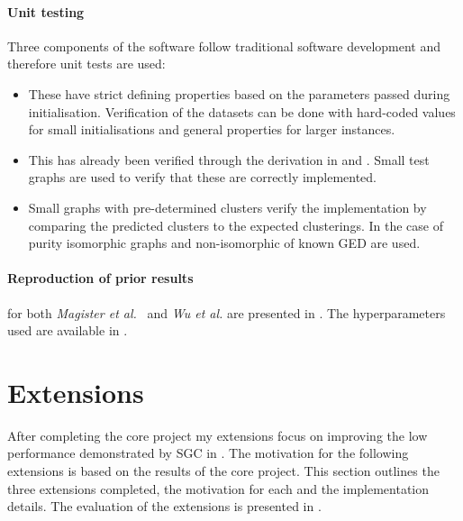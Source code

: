 \paragraph{Unit testing}
Three components of the software follow traditional software development and therefore unit tests are used:
\begin{itemize}
    \item[] 
        These have strict defining properties based on the parameters passed during initialisation.
        Verification of the datasets can be done with hard-coded values for small initialisations and
        general properties for larger instances.
    \item[] 
        This has already been verified through the derivation in  and .
        Small test graphs are used to verify that these are correctly implemented.
    \item[] 
        Small graphs with pre-determined clusters verify the implementation by comparing the predicted clusters to the expected clusterings.
        In the case of purity isomorphic graphs and non-isomorphic of known GED are used.
\end{itemize}

\paragraph{Reproduction of prior results}
for both \textit{Magister et al.}~\cite{magister2021gcexplainer} and \textit{Wu et al.}\cite{wu2019simplifying} are presented in .
The hyperparameters used are available in .

\section{Extensions}
\label{sec:extensions-imp}
After completing the core project my extensions focus on improving the low performance demonstrated by SGC in .
The motivation for the following extensions is based on the results of the core project.
This section outlines the three extensions completed, the motivation for each and the implementation details.
The evaluation of the extensions is presented in .

